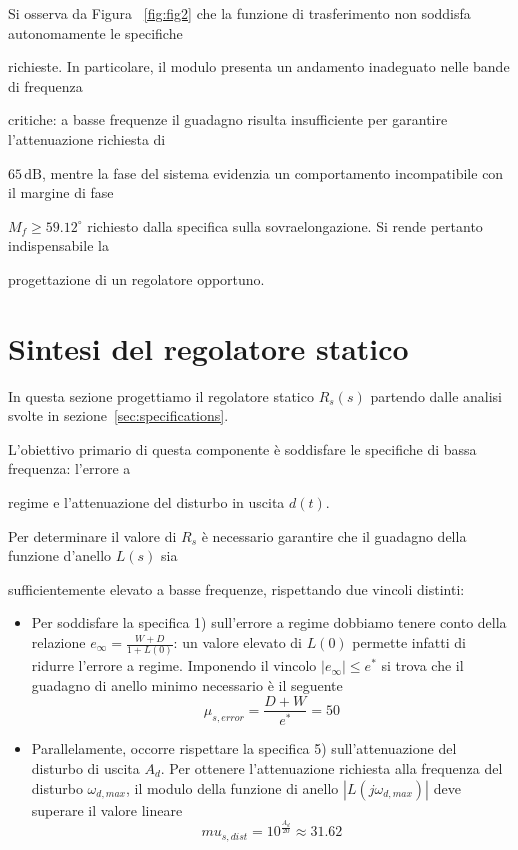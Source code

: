 \documentclass[a4paper, 11pt]{article}
\begin{document}
Si osserva da Figura ~\ref{fig:fig2} che la funzione di trasferimento non soddisfa autonomamente le specifiche 

richieste. In particolare, il modulo presenta un andamento inadeguato nelle bande di 
frequenza 

critiche: a basse frequenze il guadagno risulta insufficiente per garantire l'attenuazione richiesta di 

$65\,\text{dB}$, mentre la fase del sistema evidenzia un comportamento incompatibile con il margine di fase 

$M_f \ge 59.12^\circ$ richiesto dalla specifica sulla sovraelongazione. Si rende pertanto indispensabile la 

progettazione di un regolatore opportuno.

\section{Sintesi del regolatore statico}
\label{sec:static_regulator}

In questa sezione progettiamo il regolatore statico $R_s(s)$ partendo dalle analisi svolte in sezione~\ref{sec:specifications}.


L'obiettivo primario di questa componente è soddisfare le specifiche di bassa frequenza: l'errore a 

regime e l'attenuazione del disturbo in uscita $d(t)$.

Per determinare il valore di $R_s$ è necessario garantire che il guadagno della funzione d'anello $L(s)$ sia 

sufficientemente elevato a basse frequenze, rispettando due vincoli distinti:
\begin{itemize}
    \item [1.]
    Per soddisfare la specifica 1) sull’errore a regime dobbiamo tenere conto della relazione $e_\infty = \frac{W +D}{1+ L(0)}$: un valore elevato di $L(0)$ permette infatti di ridurre l'errore a regime.
    Imponendo il vincolo $|e_\infty| \le e^\ast$ si trova che il guadagno di anello minimo necessario è il seguente 
    \begin {equation}
        \mu_{s,error} = \frac{D + W}{e^\ast} = 50
    \end{equation}

    \item[2.]
    Parallelamente, occorre rispettare la specifica 5) sull'attenuazione del disturbo di uscita $A_d$. Per ottenere l'attenuazione richiesta alla frequenza del disturbo $\omega_{d,max}$, il modulo della funzione di anello $|L(j \omega_{d,max})|$ deve superare il valore lineare 
     \begin {equation}
        mu_{s,dist} = 10^{\frac{A_d}{20}} \approx 31.62
    \end{equation}

\end{itemize}
\end{document}
